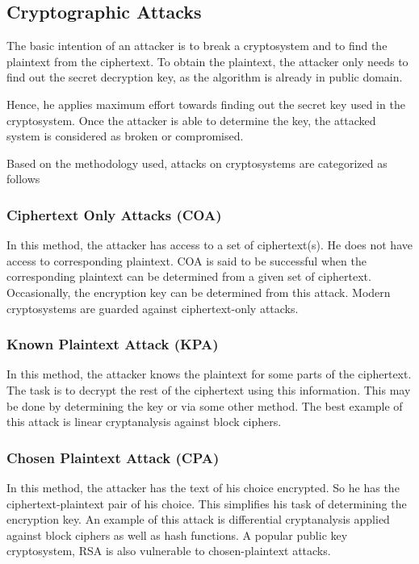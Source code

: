 \documentclass[british]{article}
\begin{document}
\subsection{Cryptographic Attacks}

The basic intention of an attacker is to break a cryptosystem and
to find the plaintext from the ciphertext. To obtain the plaintext,
the attacker only needs to find out the secret decryption key, as
the algorithm is already in public domain.

Hence, he applies maximum effort towards finding out the secret key
used in the cryptosystem. Once the attacker is able to determine the
key, the attacked system is considered as broken or compromised.

Based on the methodology used, attacks on cryptosystems are categorized
as follows \textminus{}

\subsubsection{Ciphertext Only Attacks (COA) }

In this method, the attacker has access to a set of ciphertext(s).
He does not have access to corresponding plaintext. COA is said to
be successful when the corresponding plaintext can be determined from
a given set of ciphertext. Occasionally, the encryption key can be
determined from this attack. Modern cryptosystems are guarded against
ciphertext-only attacks.

\subsubsection{Known Plaintext Attack (KPA)}

In this method, the attacker knows the plaintext for some parts of
the ciphertext. The task is to decrypt the rest of the ciphertext
using this information. This may be done by determining the key or
via some other method. The best example of this attack is linear cryptanalysis
against block ciphers.

\subsubsection{Chosen Plaintext Attack (CPA)}

In this method, the attacker has the text of his choice encrypted.
So he has the ciphertext-plaintext pair of his choice. This simplifies
his task of determining the encryption key. An example of this attack
is differential cryptanalysis applied against block ciphers as well
as hash functions. A popular public key cryptosystem, RSA is also
vulnerable to chosen-plaintext attacks.
\end{document}
